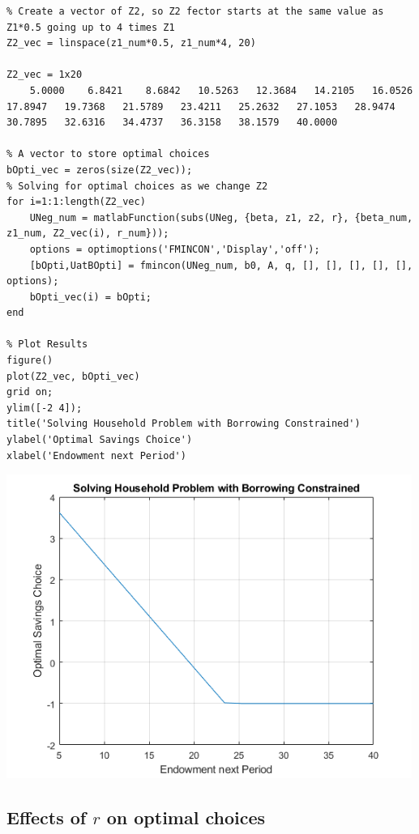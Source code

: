 \documentclass[
]{book}
\begin{document}
\begin{verbatim}
% Create a vector of Z2, so Z2 fector starts at the same value as Z1*0.5 going up to 4 times Z1
Z2_vec = linspace(z1_num*0.5, z1_num*4, 20)

Z2_vec = 1x20    
    5.0000    6.8421    8.6842   10.5263   12.3684   14.2105   16.0526   17.8947   19.7368   21.5789   23.4211   25.2632   27.1053   28.9474   30.7895   32.6316   34.4737   36.3158   38.1579   40.0000

% A vector to store optimal choices
bOpti_vec = zeros(size(Z2_vec));
% Solving for optimal choices as we change Z2
for i=1:1:length(Z2_vec)
    UNeg_num = matlabFunction(subs(UNeg, {beta, z1, z2, r}, {beta_num, z1_num, Z2_vec(i), r_num}));
    options = optimoptions('FMINCON','Display','off');
    [bOpti,UatBOpti] = fmincon(UNeg_num, b0, A, q, [], [], [], [], [], options);
    bOpti_vec(i) = bOpti;
end

% Plot Results
figure()
plot(Z2_vec, bOpti_vec)
grid on;
ylim([-2 4]);
title('Solving Household Problem with Borrowing Constrained')
ylabel('Optimal Savings Choice')
xlabel('Endowment next Period')
\end{verbatim}

\includegraphics[width=5.20833in,height=\textheight]{img/household_borrow_constrained_images/figure_0.png}

\hypertarget{effects-of-r-on-optimal-choices}{%
\subsection{\texorpdfstring{Effects of \(r\) on optimal choices}{Effects of r on optimal choices}}\label{effects-of-r-on-optimal-choices}}
\end{document}
